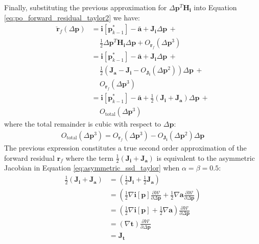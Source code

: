 Finally, substituting the previous approximation for $\Delta\mathbf{p}^T \mathbf{H}_\mathbf{i}$ into Equation \ref{eq:po_forward_residual_taylor2} we have:
\begin{equation}
    \begin{aligned}
		\check{\mathbf{r}}_f(\Delta\mathbf{p}) & = \mathbf{i}[\mathbf{p}_{k-1}^*] - \bar{\mathbf{a}} + \mathbf{J}_\mathbf{i}\Delta\mathbf{p} \, +
		\\
		& \quad \, \frac{1}{2} \Delta\mathbf{p}^T\mathbf{H}_\mathbf{i}\Delta\mathbf{p} + O_{\mathbf{r}_f}(\Delta\mathbf{p}^3)
		\\
		& = \mathbf{i}[\mathbf{p}_{k-1}^*] - \bar{\mathbf{a}} + \mathbf{J}_\mathbf{i}\Delta\mathbf{p} \, +
		\\
		& \quad \, \frac{1}{2} \left( \mathbf{J}_\mathbf{a} - \mathbf{J}_\mathbf{i} - O_{\mathbf{J}_\mathbf{i}}(\Delta\mathbf{p}^2) \right) \Delta\mathbf{p} \, +
		\\
		& \quad \, O_{\mathbf{r}_f}(\Delta\mathbf{p}^3)
		\\
		& = \mathbf{i}[\mathbf{p}_{k-1}^*] - \bar{\mathbf{a}} + \frac{1}{2} \left( \mathbf{J}_\mathbf{i} + \mathbf{J}_\mathbf{a} \right) \Delta\mathbf{p} \, +
		\\
		& \quad \, O_{\textrm{total}}(\Delta\mathbf{p}^3)
    \label{eq:po_asymmetric_residual_approximation}
    \end{aligned}
\end{equation}
where the total remainder is cubic with respect to $\Delta \mathbf{p}$:
\begin{equation}
    \begin{aligned}
		O_{\textrm{total}}(\Delta\mathbf{p}^3) = O_{\mathbf{r}_f}(\Delta\mathbf{p}^3) - O_{\mathbf{J}_\mathbf{i}}(\Delta\mathbf{p}^2) \Delta\mathbf{p}
    \label{eq:po_asymmetric_residual_approximation}
    \end{aligned}
\end{equation}
The previous expression constitutes a true second order approximation of the forward residual $\mathbf{r}_f$ where the term $\frac{1}{2} \left( \mathbf{J}_\mathbf{i} + \mathbf{J}_\mathbf{a} \right)$ is equivalent to the asymmetric Jacobian in Equation \ref{eq:asymmetric_ssd_taylor} when $\alpha = \beta = 0.5$:
\begin{equation}
    \begin{aligned}
		\frac{1}{2} \left( \mathbf{J}_\mathbf{i} + \mathbf{J}_\mathbf{a} \right) & = \left( \frac{1}{2} \mathbf{J}_\mathbf{i} + \frac{1}{2} \mathbf{J}_\mathbf{a} \right)
		\\
		& = \left( \frac{1}{2} \nabla \mathbf{i}[\mathbf{p}] \frac{\partial\mathcal{W}}{\partial\Delta\mathbf{p}} + \frac{1}{2} \nabla \mathbf{a} \frac{\partial\mathcal{W}}{\partial\Delta\mathbf{p}} \right)
		\\
		& = \left( \frac{1}{2} \nabla \mathbf{i}[\mathbf{p}] + \frac{1}{2} \nabla \mathbf{a} \right) \frac{\partial\mathcal{W}}{\partial\Delta\mathbf{p}}
		\\
		& = \left( \nabla \mathbf{t} \right) \frac{\partial\mathcal{W}}{\partial\Delta\mathbf{p}}
		\\
		& = \mathbf{J}_\mathbf{t}
    \label{eq:equivalent_jacobians}
    \end{aligned}
\end{equation}
